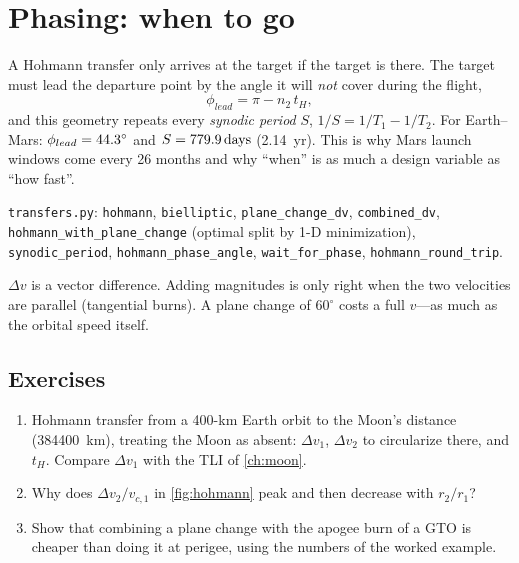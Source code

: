 \documentclass[11pt,letterpaper,oneside]{report}
\newcommand{\dv}{\Delta v}
\newcommand{\code}[1]{\texttt{#1}}
\begin{document}
\section{Phasing: when to go}
A Hohmann transfer only arrives at the target if the target is there. The target must lead the
departure point by the angle it will \emph{not} cover during the flight,
\begin{equation}
  \phi_{lead}=\pi-n_2\,t_H,
\end{equation}
and this geometry repeats every \emph{synodic period} $S$, $1/S=1/T_1-1/T_2$. For Earth--Mars:
$\phi_{lead}=\SI{44.3}{\degree}$ and $S=\SI{779.9}{days}$ (2.14~yr). This is why Mars
launch windows come every 26 months and why ``when'' is as much a design variable as ``how fast''.

\begin{codebox}
\code{transfers.py}: \code{hohmann}, \code{bielliptic}, \code{plane\_change\_dv}, \code{combined\_dv},
\code{hohmann\_with\_plane\_change} (optimal split by 1-D minimization), \code{synodic\_period},
\code{hohmann\_phase\_angle}, \code{wait\_for\_phase}, \code{hohmann\_round\_trip}.
\end{codebox}

\begin{pitfall}
$\dv$ is a vector difference. Adding magnitudes is only right when the two velocities are
parallel (tangential burns). A plane change of $60^\circ$ costs a full $v$---as much as
the orbital speed itself.
\end{pitfall}

\subsection*{Exercises}
\begin{enumerate}[label=2.\arabic*,nosep]
\item Hohmann transfer from a 400-km Earth orbit to the Moon's distance (\SI{384400}{km}), treating the Moon as absent: $\dv_1$, $\dv_2$ to circularize there, and $t_H$. Compare $\dv_1$ with the TLI of \cref{ch:moon}.
\item Why does $\dv_2/v_{c,1}$ in \cref{fig:hohmann} peak and then decrease with $r_2/r_1$?
\item Show that combining a plane change with the apogee burn of a GTO is cheaper than doing it at perigee, using the numbers of the worked example.
\end{enumerate}

\end{document}
